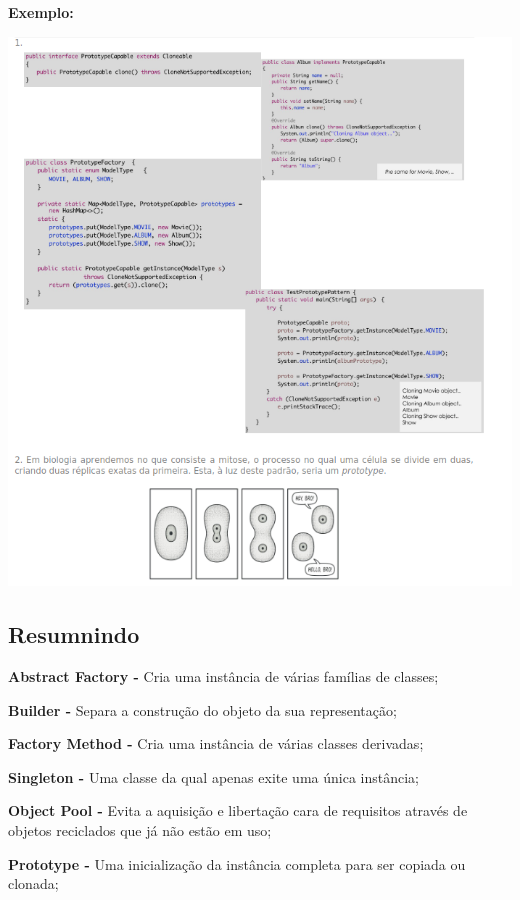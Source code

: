 \documentclass{article}
\begin{document}
\pagebreak

\begin{flushleft}
    \textbf{Exemplo:}

    \begin{center}
        \includegraphics[scale=0.6]{Images/38.png}
    \end{center}
\end{flushleft}

\pagebreak

\subsection{Resumnindo}

\begin{flushleft}
    \textbf{Abstract Factory -} Cria uma instância de várias famílias de classes;

    \vspace{2mm}
    \textbf{Builder -} Separa a construção do objeto da sua representação;

    \vspace{2mm}
    \textbf{Factory Method -} Cria uma instância de várias classes derivadas;

    \vspace{2mm}
    \textbf{Singleton -} Uma classe da qual apenas exite uma única instância;

    \vspace{2mm}
    \textbf{Object Pool -} Evita a aquisição e libertação cara de requisitos através
    de objetos reciclados que já não estão em uso;

    \vspace{2mm}
    \textbf{Prototype -} Uma inicialização da instância completa para ser copiada ou clonada;


\end{flushleft}
\end{document}
